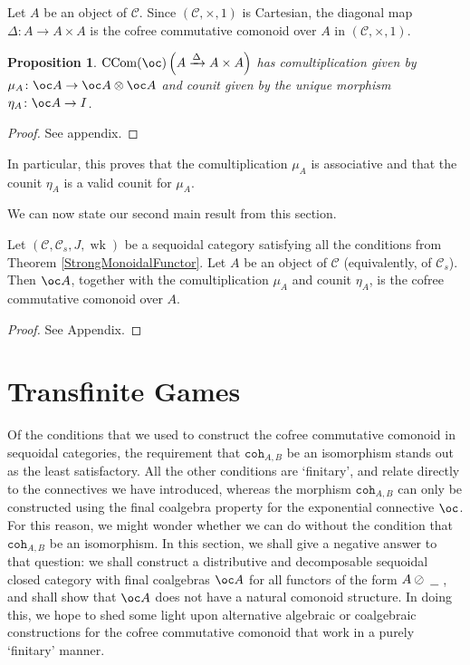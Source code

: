 \documentclass[a4paper,UKenglish]{lipics-v2016}
\theoremstyle{plain}
\newtheorem{proposition}[theorem]{Proposition}
\theoremstyle{definition}
\newcommand*\from{\colon}
\newcommand{\tensor}{\otimes}
\newcommand{\sequoid}{\oslash}
\newcommand{\C}{\mathcal C}
\newcommand{\blank}{\;\underline{\hspace{1.5ex}}\;}
\DeclareMathOperator{\wk}{wk}
\renewcommand{\int}{{\mathtt{coh}}}
\DeclareMathOperator{\CCom}{CCom}
\newlength{\arrow}
\begin{document}
Let $A$ be an object of $\C$.  Since $(\C, \times, 1)$ is Cartesian, the diagonal map $\Delta\from A\to A\times A$ is the cofree commutative comonoid over $A$ in $(\C,\times,1)$.  

\begin{proposition}\label{itsMu}
  $\CCom(\oc)\left(A\xrightarrow{\Delta}A\times A\right)$ has comultiplication given by $\mu_A\from\oc A \to \oc A\tensor\oc A$ and counit given by the unique morphism $\eta_A\from \oc A \to I$.
\end{proposition}
\begin{proof}
  See appendix.
\end{proof}

In particular, this proves that the comultiplication $\mu_A$ is associative and that the counit $\eta_A$ is a valid counit for $\mu_A$.

We can now state our second main result from this section.

\begin{theorem}
  \label{Coalgebra__CoCoCo}
  Let $(\C,\C_s,J,\wk)$ be a sequoidal category satisfying all the conditions from Theorem \ref{StrongMonoidalFunctor}.  Let $A$ be an object of $\C$ (equivalently, of $\C_s$).  Then $\oc A$, together with the comultiplication $\mu_A$ and counit $\eta_A$, is the cofree commutative comonoid over $A$.
\end{theorem}

\begin{proof}
  See Appendix.
\end{proof}

\section{Transfinite Games}

Of the conditions that we used to construct the cofree commutative comonoid in sequoidal categories, the requirement that $\int_{A,B}$ be an isomorphism stands out as the least satisfactory.  All the other conditions are `finitary', and relate directly to the connectives we have introduced, whereas the morphism $\int_{A,B}$ can only be constructed using the final coalgebra property for the exponential connective $\oc$.  For this reason, we might wonder whether we can do without the condition that $\int_{A,B}$ be an isomorphism.  In this section, we shall give a negative answer to that question: we shall construct a distributive and decomposable sequoidal closed category with final coalgebras $\oc A$ for all functors of the form $A\sequoid\blank$, and shall show that $\oc A$ does not have a natural comonoid structure.  In doing this, we hope to shed some light upon alternative algebraic or coalgebraic constructions for the cofree commutative comonoid that work in a purely `finitary' manner.
\end{document}
